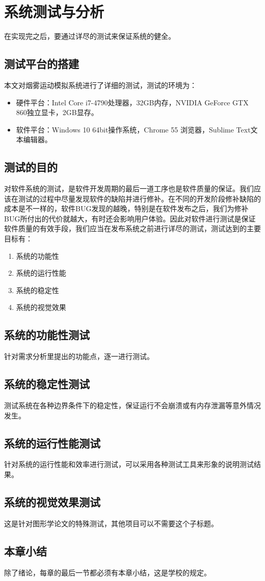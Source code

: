 \chapter{系统测试与分析}

在实现完之后，要通过详尽的测试来保证系统的健全。

\section{测试平台的搭建}

本文对烟雾运动模拟系统进行了详细的测试，测试的环境为：

\begin{itemize}
  \item 硬件平台：Intel Core i7-4790处理器，32GB内存，NVIDIA GeForce GTX 860独立显卡，2GB显存。
  \item 软件平台：Windows 10 64bit操作系统，Chrome 55 浏览器，Sublime Text文本编辑器。
\end{itemize}


\section{测试的目的}

对软件系统的测试，是软件开发周期的最后一道工序也是软件质量的保证。我们应该在测试的过程中尽量发现软件的缺陷并进行修补。在不同的开发阶段修补缺陷的成本是不一样的，软件BUG发现的越晚，特别是在软件发布之后，我们为修补BUG所付出的代价就越大，有时还会影响用户体验。因此对软件进行测试是保证软件质量的有效手段，我们应当在发布系统之前进行详尽的测试，测试达到的主要目标有：

\begin{enumerate}
\item 系统的功能性
\item 系统的运行性能
\item 系统的稳定性
\item 系统的视觉效果
\end{enumerate}


\section{系统的功能性测试}

针对需求分析里提出的功能点，逐一进行测试。

\section{系统的稳定性测试}

测试系统在各种边界条件下的稳定性，保证运行不会崩溃或有内存泄漏等意外情况发生。

\section{系统的运行性能测试}


针对系统的运行性能和效率进行测试，可以采用各种测试工具来形象的说明测试结果。


\section{系统的视觉效果测试}

这是针对图形学论文的特殊测试，其他项目可以不需要这个子标题。

\section{本章小结}

除了绪论，每章的最后一节都必须有本章小结，这是学校的规定。